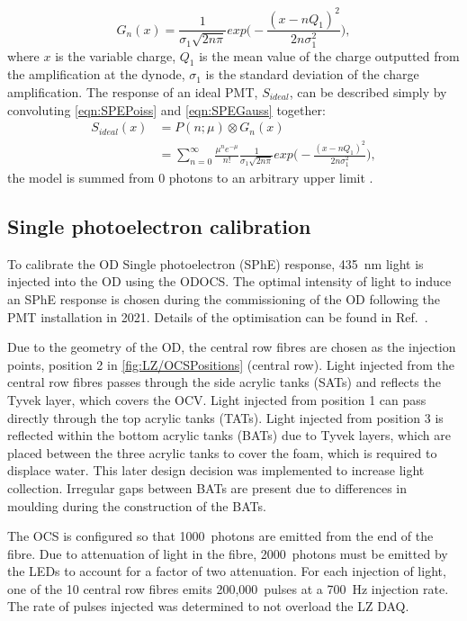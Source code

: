 \begin{equation}\label{eqn:SPEGauss}
    G_n(x)=\frac{1}{\sigma_1\sqrt{2n\pi}}exp\biggl(-\frac{(x-nQ_1)^2}{2n\sigma_1^2}\biggl),
\end{equation}
where $x$ is the variable charge, $Q_1$ is the mean value of the charge outputted from the amplification at the dynode, $\sigma_1$ is the standard deviation of the charge amplification.
The response of an ideal PMT, $S_{ideal}$, can be described simply by convoluting \autoref{eqn:SPEPoiss} and \autoref{eqn:SPEGauss} together:
\begin{equation}
    \begin{split}
    S_{ideal}(x) & = P(n;\mu)\otimes G_n(x) \\
    & = \sum^\infty_{n=0}\frac{\mu^{n}e^{-\mu}}{n!}\frac{1}{\sigma_1\sqrt{2n\pi}}exp\biggl(-\frac{(x-nQ_1)^2}{2n\sigma_1^2}\biggl),
    \end{split}
    \label{eqn:PoisPlusGauss}
\end{equation}
the model is summed from 0 photons to an arbitrary upper limit \cite{BELLAMY1994468}.
\subsection{Single photoelectron calibration}\label{sec:ODComissioning/SPhECalib}
To calibrate the OD Single photoelectron (SPhE) response, 435~nm light is injected into the OD using the ODOCS. The optimal intensity of light to induce an SPhE response is chosen during the commissioning of the OD following the PMT installation in 2021. Details of the optimisation can be found in Ref.~\cite{edfraser:thesis}.

Due to the geometry of the OD, the central row fibres are chosen as the injection points, position 2 in \autoref{fig:LZ/OCSPositions} (central row). Light injected from the central row fibres passes through the side acrylic tanks (SATs) and reflects the Tyvek layer, which covers the OCV.
Light injected from position 1 can pass directly through the top acrylic tanks (TATs). Light injected from position 3 is reflected within the bottom acrylic tanks (BATs) due to Tyvek layers, which are placed between the three acrylic tanks to cover the foam, which is required to displace water. This later design decision was implemented to increase light collection. Irregular gaps between BATs are present due to differences in moulding during the construction of the BATs.

The OCS is configured so that 1000~photons are emitted from the end of the fibre. Due to attenuation of light in the fibre, 2000~photons must be emitted by the LEDs to account for a factor of two attenuation. For each injection of light, one of the 10 central row fibres emits 200,000~pulses at a 700~Hz injection rate. The rate of pulses injected was determined to not overload the LZ DAQ.

